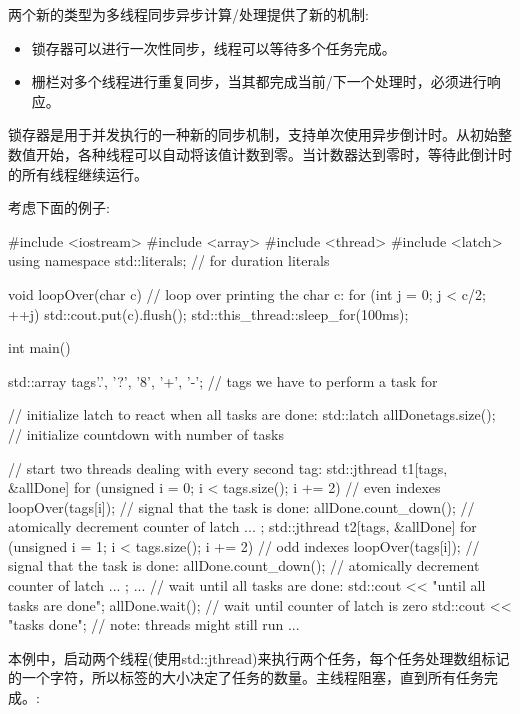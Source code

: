 
两个新的类型为多线程同步异步计算/处理提供了新的机制:

\begin{itemize}
\item
锁存器可以进行一次性同步，线程可以等待多个任务完成。

\item
栅栏对多个线程进行重复同步，当其都完成当前/下一个处理时，必须进行响应。
\end{itemize}


锁存器是用于并发执行的一种新的同步机制，支持单次使用异步倒计时。从初始整数值开始，各种线程可以自动将该值计数到零。当计数器达到零时，等待此倒计时的所有线程继续运行。

考虑下面的例子:


\begin{cpp}
#include <iostream>
#include <array>
#include <thread>
#include <latch>
using namespace std::literals; // for duration literals

void loopOver(char c) {
	// loop over printing the char c:
	for (int j = 0; j < c/2; ++j) {
		std::cout.put(c).flush();
		std::this_thread::sleep_for(100ms);
	}
}

int main()
{
	std::array tags{'.', '?', '8', '+', '-'}; // tags we have to perform a task for

	// initialize latch to react when all tasks are done:
	std::latch allDone{tags.size()}; // initialize countdown with number of tasks

	// start two threads dealing with every second tag:
	std::jthread t1{[tags, &allDone] {
			for (unsigned i = 0; i < tags.size(); i += 2) { // even indexes
				loopOver(tags[i]);
				// signal that the task is done:
				allDone.count_down(); // atomically decrement counter of latch
			}
			...
	}};
	std::jthread t2{[tags, &allDone] {
			for (unsigned i = 1; i < tags.size(); i += 2) { // odd indexes
				loopOver(tags[i]);
				// signal that the task is done:
				allDone.count_down(); // atomically decrement counter of latch
			}
			...
	}};
	...
	// wait until all tasks are done:
	std::cout << "\nwaiting until all tasks are done\n";
	allDone.wait(); // wait until counter of latch is zero
	std::cout << "\nall tasks done\n"; // note: threads might still run
	...
}
\end{cpp}

本例中，启动两个线程(使用std::jthread)来执行两个任务，每个任务处理数组标记的一个字符，所以标签的大小决定了任务的数量。主线程阻塞，直到所有任务完成。:

